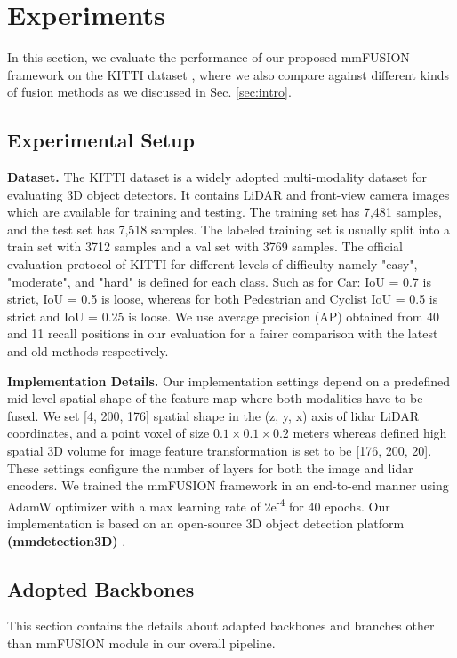 \documentclass[10pt,twocolumn,letterpaper]{article}
\begin{document}
\section{Experiments}
In this section, we evaluate the performance of our proposed mmFUSION framework on the KITTI dataset \cite{Geiger2012CVPR}, where we also compare against different kinds of fusion methods as we discussed in Sec. \ref{sec:intro}.
\subsection{Experimental Setup}
\textbf{Dataset.}
The KITTI dataset  is a widely adopted multi-modality dataset for evaluating 3D object detectors. It contains LiDAR and  front-view camera images which are available for training and testing. The training set has 7,481 samples, and the test set has 7,518 samples. The labeled training set is usually split into a train set with 3712 samples and a val set with 3769 samples. The official evaluation protocol of KITTI for different levels of difficulty namely "easy", "moderate", and "hard" is defined for each class. Such as for Car: IoU = 0.7 is strict, IoU = 0.5 is loose, whereas for both Pedestrian and Cyclist IoU = 0.5 is strict and IoU = 0.25 is loose. We use average precision (AP) obtained from 40 and 11 recall positions in our evaluation for a fairer comparison with the latest and old methods respectively. 

\textbf{Implementation Details.} 
Our implementation settings depend on a predefined mid-level spatial shape of the feature map where both modalities have to be fused. We set [4, 200, 176] spatial shape in the (z, y, x) axis of lidar LiDAR coordinates, and a point voxel of size $0.1 \times 0.1 \times 0.2$ meters whereas defined high spatial 3D volume for image feature transformation is set to be [176, 200, 20]. These settings configure the number of layers for both the image and lidar encoders. We trained the mmFUSION framework in an end-to-end manner using AdamW optimizer with a max learning rate of 2e\textsuperscript{-4} for 40 epochs. Our implementation is based on an open-source 3D object detection platform \textbf{(mmdetection3D)} \cite{contributors2020mmdetection3d}.


\subsection{Adopted Backbones}
This section contains the details about adapted backbones and branches other than mmFUSION module in our overall pipeline.  
\end{document}
